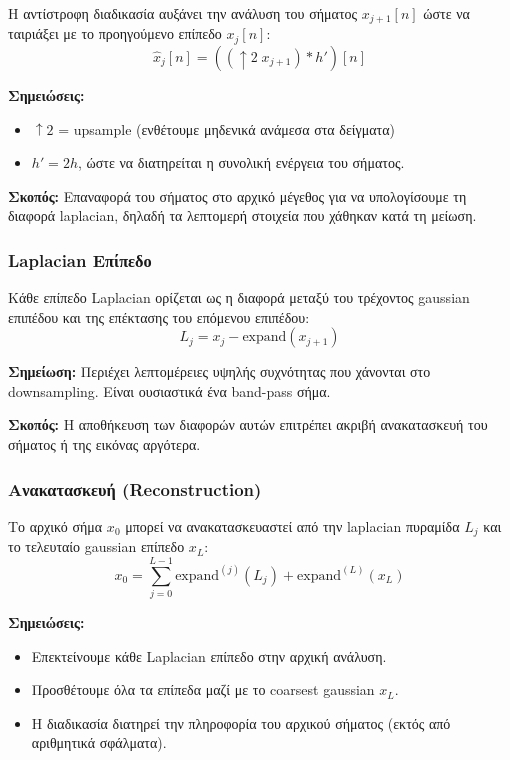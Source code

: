 \documentclass[12pt]{article}
\begin{document}
Η αντίστροφη διαδικασία αυξάνει την ανάλυση του σήματος $x_{j+1}[n]$ ώστε να ταιριάξει με το προηγούμενο επίπεδο $x_j[n]$:
\begin{equation}
\hat{x}_j[n] = ((\uparrow 2 \; x_{j+1}) * h')[n]
\label{eq:expand}
\end{equation}

\textbf{Σημειώσεις:}
\begin{itemize}
    \item $\uparrow 2$ = upsample (ενθέτουμε μηδενικά ανάμεσα στα δείγματα)
    \item $h' = 2h$, ώστε να διατηρείται η συνολική ενέργεια του σήματος.
\end{itemize}

\textbf{Σκοπός:} Επαναφορά του σήματος στο αρχικό μέγεθος για να υπολογίσουμε τη διαφορά laplacian, δηλαδή τα λεπτομερή στοιχεία που χάθηκαν κατά τη μείωση.

\subsubsection{Laplacian Επίπεδο}

Κάθε επίπεδο Laplacian ορίζεται ως η διαφορά μεταξύ του τρέχοντος gaussian επιπέδου και της επέκτασης του επόμενου επιπέδου:
\begin{equation}
L_j = x_j - \text{expand}(x_{j+1})
\label{eq:laplacian}
\end{equation}

\textbf{Σημείωση:} Περιέχει λεπτομέρειες υψηλής συχνότητας που χάνονται στο downsampling. Είναι ουσιαστικά ένα band-pass σήμα.

\textbf{Σκοπός:} Η αποθήκευση των διαφορών αυτών επιτρέπει ακριβή ανακατασκευή του σήματος ή της εικόνας αργότερα.

\subsubsection{Ανακατασκευή (Reconstruction)}

Το αρχικό σήμα $x_0$ μπορεί να ανακατασκευαστεί από την laplacian πυραμίδα $L_j$ και το τελευταίο gaussian επίπεδο $x_L$:
\begin{equation}
x_0 = \sum_{j=0}^{L-1} \text{expand}^{(j)}(L_j) + \text{expand}^{(L)}(x_L)
\label{eq:reconstruction}
\end{equation}

\textbf{Σημειώσεις:}
\begin{itemize}
    \item Επεκτείνουμε κάθε Laplacian επίπεδο στην αρχική ανάλυση.
    \item Προσθέτουμε όλα τα επίπεδα μαζί με το coarsest gaussian $x_L$.
    \item Η διαδικασία διατηρεί την πληροφορία του αρχικού σήματος (εκτός από αριθμητικά σφάλματα).
\end{itemize}
\end{document}
